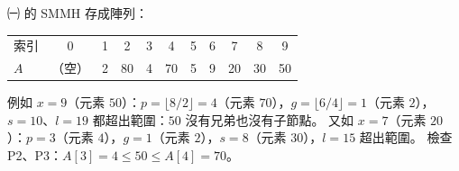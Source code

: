 \begin{pastsoln}
㈠ 的 SMMH 存成陣列：
\begin{center}
\small
\begin{tabular}{l*{10}{|c}|}
索引 & 0 & 1 & 2 & 3 & 4 & 5 & 6 & 7 & 8 & 9 \\ 
$A$ & （空） & 2 & 80 & 4 & 70 & 5 & 9 & 20 & 30 & 50 \\ 
\end{tabular}
\end{center}
例如 $x = 9$（元素 $50$）：$p = \lfloor 8/2 \rfloor = 4$（元素 $70$），$g = \lfloor 6/4 \rfloor = 1$（元素 $2$），
$s = 10$、$l = 19$ 都超出範圍：$50$ 沒有兄弟也沒有子節點。 又如 $x = 7$（元素 $20$）：$p = 3$（元素
$4$），$g = 1$（元素 $2$），$s = 8$（元素 $30$），$l = 15$ 超出範圍。 檢查 P2、P3：$A[3] = 4 \le 50 \le A[4] = 70$。
\end{pastsoln}
